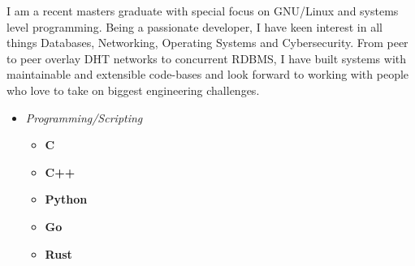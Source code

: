 \documentclass[9]{Resume}
\begin{document}
\begin{minipage}[t]{0.45\textwidth}
    \vspace{-\baselineskip}

        I am a recent masters graduate with special focus on GNU/Linux and systems level programming.
        Being a passionate developer, I have keen interest in all things Databases, Networking, Operating Systems and Cybersecurity.
        From peer to peer overlay DHT networks to concurrent RDBMS, I have built systems with maintainable and extensible code-bases and look forward to working with people who love to take on biggest engineering challenges.
\end{minipage}
\hfill
\begin{minipage}[t]{0.45\textwidth}
    \vspace{-\baselineskip}

    \begin{itemize}[noitemsep,nolistsep,leftmargin=*]
    \setlength\itemsep{-1em}
    \item[]\textit{Programming/Scripting}
            \vspace{-1em}
            \begin{multicols}{2}
            \begin{itemize}[leftmargin=*]
            \setlength\itemsep{-0.25em}
                \item[]\textbf{C}\hspace{48pt}
                \item[]\textbf{C++}\hspace{37pt}
                \item[]\textbf{Python}\hspace{25pt}
                \item[]\textbf{Go}\hspace{28pt}
                \item[]\textbf{Rust}\hspace{21.5pt}
            \end{itemize}
            \end{multicols}


\end{itemize}
\end{minipage}
\end{document}
